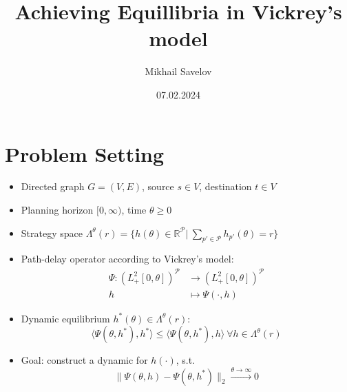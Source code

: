 \documentclass[10pt]{beamer}
\author{Mikhail Savelov}
\title{Achieving Equillibria in Vickrey's model}
\subtitle{}
\institute{University of Passau}
\date{07.02.2024}
\begin{document}
\begin{frame}

\titlepage

\end{frame}

\begin{frame}
\tableofcontents
\end{frame}

\section{Problem Setting}

\begin{frame}

\begin{itemize}

\item Directed graph $G = (V,E)$, source $s \in V$, destination $t \in V$

\item Planning horizon $[0, \infty)$, time $\theta \geq 0$

\item Strategy space $ \Lambda^{\theta}(r) = \{ h(\theta) \in \mathbb{R}^{\mathcal{P}} |~ \sum_{p' \in \mathcal{P}} h_{p'}(\theta) = r \} $

\item Path-delay operator according to Vickrey's model:
\begin{align*}
\Psi: ( L^2_{+}[0, \theta] )^{\mathcal{P}} &\to ( L^2_{+}[0, \theta] )^{\mathcal{P}} \\
 h &\mapsto \Psi(\cdot, h)
\end{align*}

\item Dynamic equilibrium $h^*(\theta) \in \Lambda^{\theta}(r) $:
  $$ \langle \Psi(\theta, h^*), h^* \rangle \leq \langle \Psi(\theta,  h^*), h \rangle ~\forall h \in  \Lambda^{\theta}(r)  $$

\item Goal: construct a dynamic for $h(\cdot)$, s.t. $$ \lVert \Psi(\theta, h) - \Psi(\theta, h^*) \rVert_2   \stackrel{\theta \to \infty}{\to} 0 $$

\end{itemize}


\end{frame}
\end{document}
